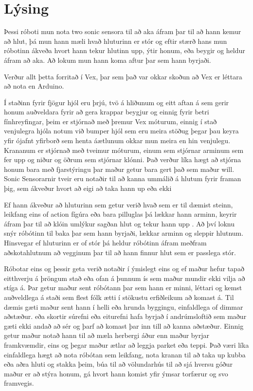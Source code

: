 \section{Lýsing}

\begin{center}
Þessi róboti mun nota two sonic sensora til að aka áfram þar til að hann kemur að hlut, þá mun hann mæli hvað hluturinn er stór og eftir stærð hans mun róbotinn ákveða hvort hann tekur hlutinn upp, ýtir honum, eða beygir og heldur áfram að aka.
Að lokum mun hann koma aftur þar sem hann byrjaði.

Verður allt þetta forritað í Vex, þar sem það var okkar skoðun að Vex er léttara að nota en Arduino.


Í staðinn fyrir fjögur hjól eru þrjú, tvö á hliðunum og eitt aftan á sem gerir honum auðveldara fyrir að gera krappar beygjur og einnig fyrir betri fínhreyfingar, þeim er stjórnað með þremur Vex móturum, einnig í stað venjulegra hjóla notum við bumper hjól sem eru meira stöðug þegar þau keyra yfir ójafnt yfirborð sem henta áætlunum okkar mun meira en hin venjulegu.
Krananum er stjórnað með tveimur móturum, einum sem stjórnar arminum sem fer upp og niður og öðrum sem stjórnar klónni.
Það verður líka hægt að stjórna honum bara með fjarstýringu þar maður getur bara gert það sem maður will.
Sonic Sensorarnir tveir eru notaðir til að kanna ummálið á hlutum fyrir framan þig, sem ákveður hvort að eigi að taka hann up eða ekki


Ef hann ákveður að hluturinn sem getur verið hvað sem er til dæmist steinn, leikfang eins of action fígúra eða bara pilluglas þá lækkar hann arminn, keyrir áfram þar til að klóin umlýkur sagðan hlut og tekur hann upp .
Að því loknu snýr róbótinn til baka þar sem hann byrjaði, lækkar arminn og sleppir hlutnum.
Hinsvegar ef hluturinn er of stór þá heldur róbótinn áfram meðfram aðskotahlutnum að vegginum þar til að hann finnur hlut sem er passlega stór.



Róbotar eins og þessir geta verið notaðir í ýmislegt eins og ef maður hefur tapað eitthverju á þröngum stað eða ofan á þunnum ís sem maður mundir ekki vilja að stíga á.
Þar getur maður sent róbótann þar sem hann er minni, léttari og kemst auðveldlega á staði sem flest fólk ætti í stökustu erfiðleikum að komast á.
Til dæmis gæti maður sent hann í helli eða hrunda byggingu, einfaldlega of dimmar aðstæður. eða skortir súrefni eða eiturefni hafa byrjað í andrúmsloftið sem maður gæti ekki andað að sér og þarf að komast þar inn till að kanna aðstæður.
Einnig getur maður notað hann til að mæla herbergi áður enn maður byrjar framkvæmdir, eins og þegar maður ætlar að leggja parket eða teppi.
Það væri líka einfaldlega hægt að nota róbótan sem leikfang, nota kranan til að taka up kubba eða aðra hluti og stakka þeim, búa til að völundarhús til að sjá hversu góður maður er að stýra honum, gá hvort hann komist yfir ýmsar torfærur og svo framvegis.

\end{center}
